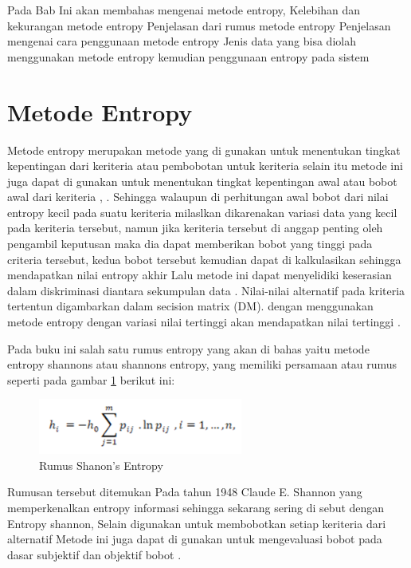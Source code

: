 Pada Bab Ini akan membahas mengenai metode entropy,
Kelebihan dan kekurangan metode entropy 
Penjelasan dari rumus metode entropy
Penjelasan mengenai cara penggunaan metode entropy
Jenis data yang bisa diolah menggunakan metode entropy kemudian penggunaan entropy pada sistem
\pagebreak

\section{Metode Entropy}

Metode entropy merupakan metode yang di gunakan untuk menentukan tingkat kepentingan dari keriteria atau pembobotan untuk keriteria  selain itu metode ini juga dapat di gunakan untuk menentukan tingkat kepentingan awal atau bobot awal dari keriteria \cite{harahap2017penerapan}, \cite{chai2018new}. Sehingga walaupun di perhitungan awal bobot dari nilai entropy kecil pada suatu keriteria milaslkan dikarenakan variasi data yang kecil pada keriteria tersebut, namun jika keriteria tersebut di anggap penting oleh pengambil keputusan maka dia dapat memberikan bobot yang tinggi pada criteria tersebut, kedua bobot tersebut kemudian dapat di kalkulasikan sehingga mendapatkan nilai entropy akhir Lalu metode ini dapat menyelidiki keserasian dalam diskriminasi diantara sekumpulan data\cite{malekian2016application} . Nilai-nilai alternatif pada kriteria tertentun digambarkan dalam secision matrix (DM). dengan menggunakan metode entropy dengan variasi nilai tertinggi akan mendapatkan nilai tertinggi \cite{meiriza2019implementasi}.

Pada buku ini salah satu rumus entropy yang akan di bahas yaitu metode entropy shannons atau shannons entropy, yang memiliki persamaan atau rumus seperti pada gambar \ref{r1} berikut ini:

\begin{figure}[h]
	\centerline{\includegraphics[width=0.6\textwidth]{figures/rumus/1.png}}
	\caption{Rumus Shanon's Entropy}
	\label{r1}
\end{figure}


Rumusan tersebut ditemukan Pada tahun 1948 Claude E. Shannon yang memperkenalkan entropy informasi sehingga sekarang sering di sebut dengan Entropy shannon, Selain digunakan untuk membobotkan setiap keriteria dari alternatif Metode ini juga dapat di gunakan untuk mengevaluasi bobot pada dasar subjektif dan objektif bobot \cite{wu2011determination}.

